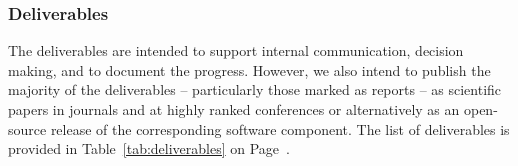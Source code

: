 
\subsubsection{Deliverables}
The deliverables are intended to support internal communication, decision making, and to document the progress. However, we also intend to publish the majority of the deliverables -- particularly those marked as reports -- as scientific papers in journals and at highly ranked conferences or alternatively as an open-source release of the corresponding software component. The list of deliverables is provided in Table~\ref{tab:deliverables} on Page~\pageref{tab:deliverables}.

